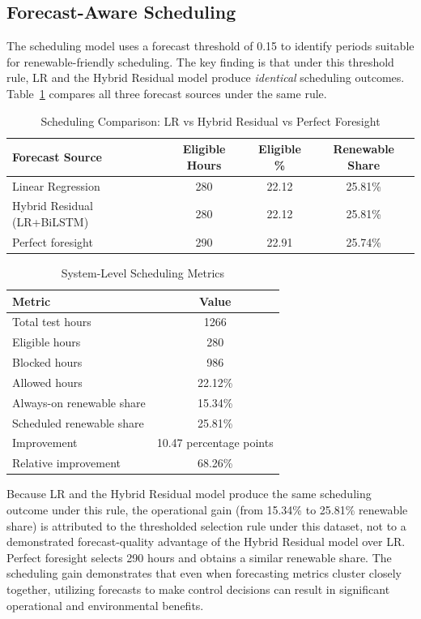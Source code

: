 \documentclass{ieeeaccess}
\begin{document}
\subsection{Forecast-Aware Scheduling}
The scheduling model uses a forecast threshold of 0.15 to identify periods suitable for renewable-friendly scheduling. The key finding is that under this threshold rule, LR and the Hybrid Residual model produce \emph{identical} scheduling outcomes. Table~\ref{tab:scheduling_comparison} compares all three forecast sources under the same rule.

\begin{table}[!t]
\caption{Scheduling Comparison: LR vs Hybrid Residual vs Perfect Foresight}
\label{tab:scheduling_comparison}
\centering
\begin{tabular}{lccc}
\toprule
Forecast Source & Eligible Hours & Eligible \% & Renewable Share \\
\midrule
Linear Regression & 280 & 22.12 & 25.81\% \\
Hybrid Residual (LR+BiLSTM) & 280 & 22.12 & 25.81\% \\
Perfect foresight & 290 & 22.91 & 25.74\% \\
\bottomrule
\end{tabular}
\end{table}

\begin{table}[!t]
\caption{System-Level Scheduling Metrics}
\label{tab:scheduling_metrics}
\centering
\begin{tabular}{lc}
\toprule
Metric & Value \\
\midrule
Total test hours & 1266 \\
Eligible hours & 280 \\
Blocked hours & 986 \\
Allowed hours & 22.12\% \\
Always-on renewable share & 15.34\% \\
Scheduled renewable share & 25.81\% \\
Improvement & 10.47 percentage points \\
Relative improvement & 68.26\% \\
\bottomrule
\end{tabular}
\end{table}

Because LR and the Hybrid Residual model produce the same scheduling outcome under this rule, the operational gain (from 15.34\% to 25.81\% renewable share) is attributed to the thresholded selection rule under this dataset, not to a demonstrated forecast-quality advantage of the Hybrid Residual model over LR. Perfect foresight selects 290 hours and obtains a similar renewable share. The scheduling gain demonstrates that even when forecasting metrics cluster closely together, utilizing forecasts to make control decisions can result in significant operational and environmental benefits.
\end{document}
